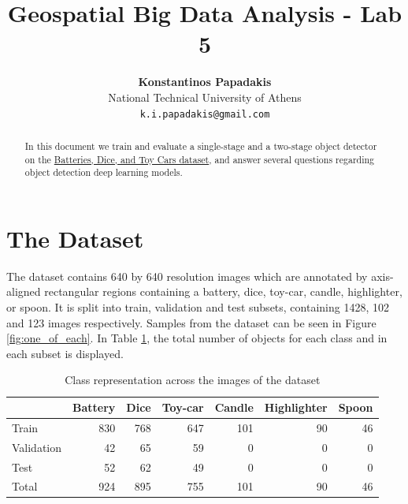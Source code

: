 \documentclass{article}
\title{Geospatial Big Data Analysis - Lab 5}
\author{
    \textbf{Konstantinos Papadakis}\\
    National Technical University of Athens\\
    \texttt{k.i.papadakis@gmail.com}
}
\date{\vspace{-5ex}}
\begin{document}
\maketitle

\begin{abstract}
    In this document we train and evaluate a single-stage and a two-stage object detector on the \href{https://www.kaggle.com/datasets/markcsizmadia/object-detection-batteries-dices-and-toy-cars}{Batteries, Dice, and Toy Cars dataset}, and answer several questions regarding object detection deep learning models.
\end{abstract}

\section{The Dataset}
The dataset contains 640 by 640 resolution images which are annotated by axis-aligned rectangular regions containing a battery, dice, toy-car, candle, highlighter, or spoon. It is split into train, validation and test subsets, containing 1428, 102 and 123 images respectively. Samples from the dataset can be seen in Figure \ref{fig:one_of_each}. In Table \ref{table:counts}, the total number of objects for each class and in each subset is displayed.

\begin{table}[h]
    \centering
    \begin{tabular}{lrrrrrr}
        \toprule
                   & Battery & Dice & Toy-car & Candle & Highlighter & Spoon \\
        \midrule
        Train      & 830     & 768  & 647     & 101    & 90          & 46    \\
        Validation & 42      & 65   & 59      & 0      & 0           & 0     \\
        Test       & 52      & 62   & 49      & 0      & 0           & 0     \\
        Total      & 924     & 895  & 755     & 101    & 90          & 46    \\
        \bottomrule
    \end{tabular}
    \caption{Class representation across the images of the dataset}
    \label{table:counts}
\end{table}
\end{document}
